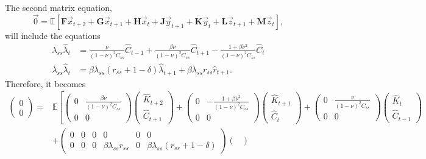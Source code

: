 \documentclass[11pt]{article}
\numberwithin{equation}{section} %
\numberwithin{figure}{section} %
\numberwithin{table}{section} %
\theoremstyle{definition}
\newcommand{\E}{\mathbb{E}}
\begin{document}
The second matrix equation,
\[
    \vec 0 = \mathbb{E} \left[ \mathbf{F} \vec{x}_{t+2} + \mathbf{G} \vec{x}_{t+1} + \mathbf{H} \vec{x}_t + \mathbf{J} \vec{y}_{t+1} + \mathbf{K} \vec{y}_t + \mathbf{L} \vec{z}_{t+1} + \mathbf{M} \vec{z}_t \right],
\]
will include the equations
\begin{align*}
    \lambda_{ss} \hat{\lambda}_t &= \frac{\nu}{(1 - \nu)^2 C_{ss}} \hat{C}_{t-1} + \frac{\beta \nu}{(1 - \nu)^2 C_{ss}} \hat{C}_{t+1} - \frac{1 + \beta \nu^2}{(1 - \nu)^2 C_{ss}} \hat{C}_t \\
    \lambda_{ss} \hat{\lambda}_t &= \beta \lambda_{ss} (r_{ss} + 1 - \delta) \hat{\lambda}_{t+1} + \beta \lambda_{ss} r_{ss} \hat{r}_{t+1}.
\end{align*}
Therefore, it becomes
\begin{align*}
    \begin{pmatrix}
        0 \\ 0
    \end{pmatrix} = &\E \left[ \begin{pmatrix}
        0 & \frac{\beta \nu}{(1 - \nu)^2 C_{ss}} \\
        0 & 0
    \end{pmatrix} \begin{pmatrix}
        \hat{K}_{t+2} \\
        \hat{C}_{t+1}
    \end{pmatrix} + \begin{pmatrix}
        0 & -\frac{1 + \beta \nu^2}{(1 - \nu)^2 C_{ss}} \\
        0 & 0
    \end{pmatrix} \begin{pmatrix}
        \hat{K}_{t+1} \\
        \hat{C}_t
    \end{pmatrix} + \begin{pmatrix}
        0 & \frac{\nu}{(1 - \nu)^2 C_{ss}} \\
        0 & 0
    \end{pmatrix} \begin{pmatrix}
        \hat{K}_t \\
        \hat{C}_{t-1}
    \end{pmatrix}
    \right. \\
    &+ \begin{pmatrix}
        0 & 0 & 0 & 0 & 0 & 0 \\
        0 & 0 & 0 & \beta \lambda_{ss} r_{ss} & 0 & \beta \lambda_{ss} (r_{ss} + 1 - \delta)
    \end{pmatrix} \begin{pmatrix}

\end{pmatrix}
\end{align*}
\end{document}
